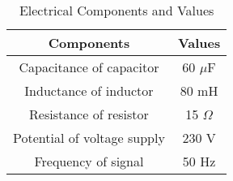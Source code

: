 \documentclass{article}
\begin{document}
	
	\begin{table}[htbp]
		\centering
		\begin{tabular}{|c|c|}
			\hline
			\textbf{Components} & \textbf{Values} \\
			\hline
			Capacitance of capacitor & 60 $\mu$F \\
			Inductance of inductor & 80 mH \\
			Resistance of resistor & 15 $\Omega$ \\
			Potential of voltage supply & 230 V \\
			Frequency of signal & 50 Hz \\
			\hline
		\end{tabular}
		\caption*{Electrical Components and Values} %
	\end{table}
	
\end{document}
